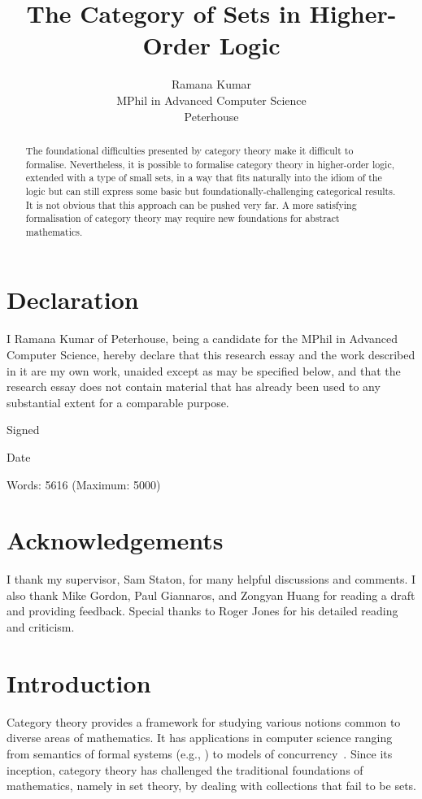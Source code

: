 \documentclass[twoside,titlepage,11pt]{article}
\title{The Category of Sets in Higher-Order Logic}
\author{Ramana Kumar\\MPhil in Advanced Computer Science\\Peterhouse}
\begin{document}
\maketitle
\section*{Declaration}%
\thispagestyle{empty}
I Ramana Kumar of Peterhouse, being a candidate for the MPhil in Advanced Computer Science, hereby declare that this research essay and the work described in it are my own work, unaided except as may be specified below, and that the research essay does not contain material that has already been used to any substantial extent for a comparable purpose.

\vspace{1em}
\noindent Signed

\vspace{1em}
\noindent Date

\vspace{2em}
\noindent Words: 5616 (Maximum: 5000)
\vspace{5em}
\section*{Acknowledgements}%
I thank my supervisor, Sam Staton, for many helpful discussions and comments.
I also thank Mike Gordon, Paul Giannaros, and Zongyan Huang for reading a draft and providing feedback.
Special thanks to Roger Jones for his detailed reading and criticism.
\begin{abstract}%
The foundational difficulties presented by category theory make it difficult to formalise.
Nevertheless, it is possible to formalise category theory in higher-order logic, extended with a type of small sets, in a way that fits naturally into the idiom of the logic but can still express some basic but foundationally-challenging categorical results.
It is not obvious that this approach can be pushed very far.
A more satisfying formalisation of category theory may require new foundations for abstract mathematics.
\end{abstract}%
\section{Introduction}%
Category theory provides a framework for studying various notions common to diverse areas of mathematics.
It has applications in computer science ranging from semantics of formal systems (e.g., \cite{CroleCT,JacobsCLTT}) to models of concurrency~\cite{DBLP:conf/csl/CattaniW96}.
Since its inception, category theory has challenged the traditional foundations of mathematics, namely in set theory, by dealing with collections that fail to be sets.
\end{document}
